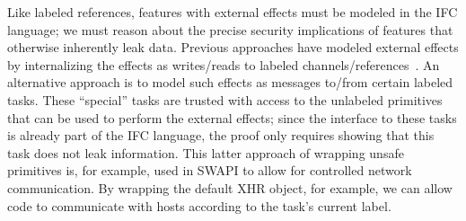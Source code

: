Like labeled references, features with external effects must be
modeled in the IFC language; we must reason about the precise security
implications of features that otherwise inherently leak data.
%
Previous approaches have modeled external effects by internalizing the
effects as writes/reads to labeled channels/references~\tocite{}.
%
An alternative approach is to model such effects as messages to/from
certain labeled tasks.
%
These ``special'' tasks are trusted with access to the unlabeled
primitives that can be used to perform the external effects; since the
interface to these tasks is already part of the IFC language, the
proof only requires showing that this task does not leak information.
%
This latter approach of wrapping unsafe primitives is, for example,
used in SWAPI to allow for controlled network communication.
%
By wrapping the default XHR object, for example, we can allow code
to communicate with hosts according to the task's current label.
